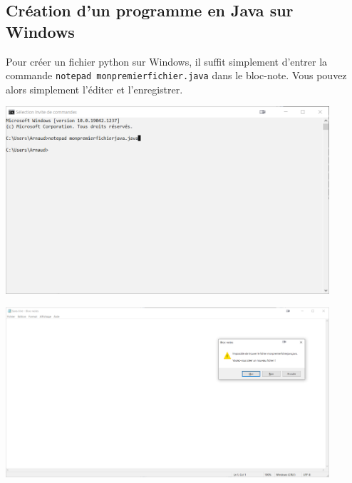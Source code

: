 \subsection{Création d'un programme en Java sur Windows}

Pour créer un fichier python sur Windows, il suffit simplement d'entrer la commande \lstinline{notepad monpremierfichier.java} dans le bloc-note. Vous pouvez alors simplement l'éditer et l'enregistrer.

\begin{center}
	\includegraphics[width=12cm]{2j}
\end{center}
\begin{center}
	\includegraphics[width=12cm]{3j}
\end{center}

